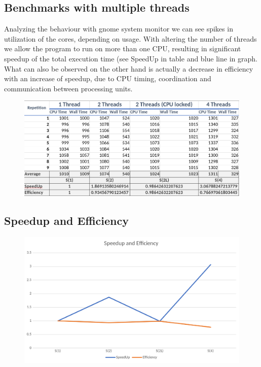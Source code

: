 \documentclass[11pt,a4paper]{article}
\begin{document}
\subsection{Benchmarks with multiple threads}
Analyzing the behaviour with gnome system monitor we can see spikes in utilization of the cores, depending on usage. With altering the number of threads we allow the program to run on more than one CPU, resulting in significant speedup of the total execution time (see SpeedUp in table and blue line in graph. What can also be observed on the other hand is actually a decrease in efficiency with an increase of speedup, due to CPU timing, coordination and communication between processing units.
\begin{figure}[h]
\centering
\includegraphics[width=\textwidth]{foto/times.png}
\end{figure}
\subsection{Speedup and Efficiency}
\begin{figure}[h]
\centering
\includegraphics[width=\textwidth]{foto/speedup.png}
\end{figure}
\end{document}
